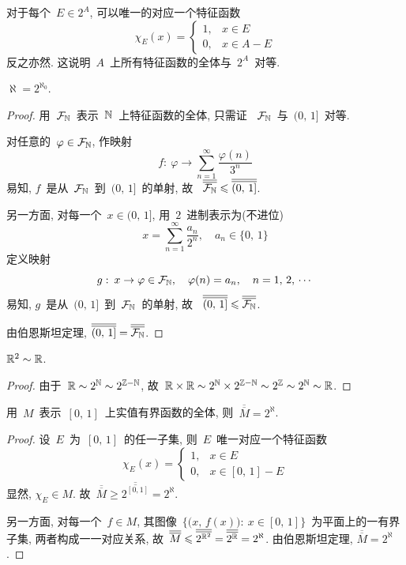 对于每个~$E \in 2^A$, 可以唯一的对应一个特征函数
\[
\chi_E(x) = \left\{\!\!
\begin{array}{ll}
1, & x \in E \\
0, & x \in A - E
\end{array}
\right.
\]
反之亦然. 这说明~$A$~上所有特征函数的全体与~$2^A$~对等.

\begin{theorem} \label{thm1.3.11}
$\aleph = 2^{\aleph_0}$.
\end{theorem}

\begin{proof}
用~$\mathcal{F_{\mathbb{N}}}$~表示~$\mathbb{N}$~上特征函数的全体, 只需证
~$\mathcal{F_{\mathbb{N}}}$~与~$(0,\,1]$~对等.

对任意的~$\varphi \in \mathcal{F_{\mathbb{N}}}$, 作映射
\[
f: \: \varphi \rightarrow \sum_{n=1} ^\infty \frac{\varphi(n)}{3^n}
\]
易知, $f$~是从~$\mathcal{F_{\mathbb{N}}}$~到~$(0,\,1]$~的单射, 故
~$\overline{\overline{\mathcal{F_{\mathbb{N}}}}} \leqslant \overline{\overline{(0,\,1]}}$.

另一方面, 对每一个~$x \in (0,\,1]$, 用~$2$~进制表示为(不进位)
\[
x = \sum_{n=1} ^\infty \frac{a_n}{2^n}, \quad a_n \in \{0,\,1\}
\]
定义映射
\[
g: \: x \rightarrow \varphi \in \mathcal{F_{\mathbb{N}}}, \quad \varphi(n) = a_n, \quad n = 1, \,2, \, \cdots
\]
易知, $g$~是从~$(0,\,1]$~到~$\mathcal{F_{\mathbb{N}}}$~的单射, 故
~$\overline{\overline{(0,\,1]}} \leqslant \overline{\overline{\mathcal{F_{\mathbb{N}}}}}$.

由伯恩斯坦定理, $\overline{\overline{(0,\,1]}} = \overline{\overline{\mathcal{F_{\mathbb{N}}}}}$.
\end{proof}

\medskip

\begin{example}
$\mathbb{R}^2 \sim \mathbb{R}$.
\end{example}

\begin{proof}
由于~$\mathbb{R} \sim 2^{\mathbb{N}} \sim 2^{\mathbb{Z} - \mathbb{N}}$, 故~$\mathbb{R} \times \mathbb{R} \sim 2^{\mathbb{N}} \times 2^{\mathbb{Z} - \mathbb{N}} \sim 2^{\mathbb{Z}} \sim 2^{\mathbb{N}} \sim \mathbb{R}$.
\end{proof}

\medskip

\begin{example}
用~$M$~表示~$[0,\,1]$~上实值有界函数的全体, 则~$\overline{\overline{M}} = 2^\aleph$.
\end{example}

\begin{proof}
设~$E$~为~$[0,\,1]$~的任一子集, 则~$E$~唯一对应一个特征函数
\[
\chi_E(x) = \left\{\!\!
\begin{array}{ll}
1, & x \in E \\
0, & x \in [0,\,1] - E
\end{array}
\right.
\]
显然, $\chi_E \in M$. 故~$\overline{\overline{M}} \geqslant \overline{\overline{2^{[0,1]}}} = 2^\aleph$.

另一方面, 对每一个~$f \in M$, 其图像~$\{\big(x,\,f(x)\big): \: x \in [0,\,1]\}$~为平面上的一有界子集,
两者构成一一对应关系, 故~$\overline{\overline{M}} \leqslant \overline{\overline{2^{\mathbb{R}^2}}} = \overline{\overline{2^{\mathbb{R}}}} = 2^\aleph$. 由伯恩斯坦定理, $\overline{\overline{M}} = 2^\aleph$.
\end{proof}

